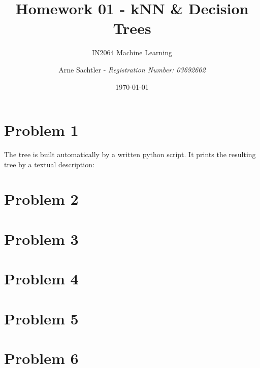 \documentclass{scrartcl}
\title{Homework 01 - kNN \& Decision Trees}
\author{Arne Sachtler - \textit{Registration Number: 03692662}}
\date{\today}
\subtitle{IN2064 Machine Learning}
\begin{document}
\maketitle
	
\section{Problem 1}
The tree is built automatically by a written python script. It prints the resulting tree by a textual description:

\section{Problem 2}
\section{Problem 3}
\section{Problem 4}
\section{Problem 5}
\section{Problem 6}
\end{document}
